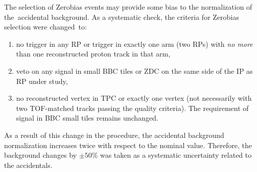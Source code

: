 The selection of Zerobias events may provide some bias to the normalization of the~accidental background. As a systematic check, the criteria for  Zerobias selection were changed~to:
 \begin{enumerate}
 	\item no trigger in any RP or trigger in exactly one arm (two RPs) with \textit{no more} than one reconstructed proton track in that arm,
 	\item veto on any signal in small BBC tiles or ZDC on the same  side of the IP as  RP under study,
 	\item no reconstructed vertex in TPC or exactly one vertex (not necessarily  with two TOF-matched tracks passing the quality criteria). The requirement of signal in BBC small tiles remains unchanged. 
 \end{enumerate}
 As a result of this change in the procedure, the accidental background normalization increases twice with respect to the nominal value. Therefore, the background changes by $\pm50\%$ was taken as a systematic uncertainty related to the accidentals.






